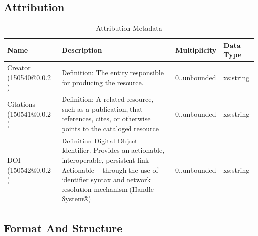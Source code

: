 \documentclass{article}
\begin{document}
\subsection{Attribution}

\begin{table}[h]
	\begin{center}
		\caption{Attribution Metadata}
		\label{tab:attribution}
		\begin{tabular}{ p{3cm} | p{5cm} | p{2cm} | p{1cm}  } 
			\textbf{Name} &	\textbf{Description	}& \textbf{Multiplicity} &	\textbf{Data Type }\\
			\hline
			Creator (150540@0.0.2  )	& Definition:	The entity responsible for producing the resource.&	0..unbounded &	xs:string
			\\
			\hline
			 Citations (150541@0.0.2 )	& Definition: A related resource, such as a publication, that references, cites, or otherwise points to the cataloged resource &	0..unbounded&	xs:string \\
			\hline
			DOI (150542@0.0.2 ) &	Definition Digital Object Identifier.
			Provides an actionable, interoperable, persistent link
			Actionable – through the use of identifier syntax and network resolution mechanism (Handle System®)
			& 0..unbounded &	xs:string \\
		\end{tabular}
	\end{center}
\end{table}
\FloatBarrier
\newpage
\subsection{Format And Structure}
\end{document}
